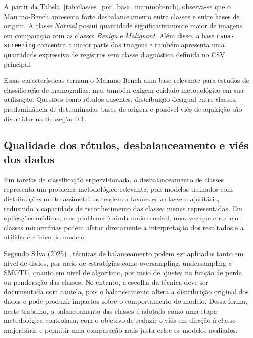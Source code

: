 \documentclass[
    12pt,
    openright,
    oneside,
    a4paper,
    english,
    brazil
]{abntex2}
\begin{document}
A partir da Tabela~\ref{tab:classes_por_base_mammobench}, observa-se que o Mammo-Bench apresenta forte desbalanceamento entre classes e entre bases de origem. A classe \textit{Normal} possui quantidade significativamente maior de imagens em comparação com as classes \textit{Benign} e \textit{Malignant}. Além disso, a base \texttt{rsna-screening} concentra a maior parte das imagens e também apresenta uma quantidade expressiva de registros sem classe diagnóstica definida no CSV principal.

Essas características tornam o Mammo-Bench uma base relevante para estudos de classificação de mamografias, mas também exigem cuidado metodológico em sua utilização. Questões como rótulos ausentes, distribuição desigual entre classes, predominância de determinadas bases de origem e possível viés de aquisição são discutidas na Subseção~\ref{subsec:qualidade_rotulos_balanceamento_vies}.



\subsection{Qualidade dos rótulos, desbalanceamento e viés dos dados}
\label{subsec:qualidade_rotulos_balanceamento_vies}

Em tarefas de classificação supervisionada, o desbalanceamento de classes representa um problema metodológico relevante, pois modelos treinados com distribuições muito assimétricas tendem a favorecer a classe majoritária, reduzindo a capacidade de reconhecimento das classes menos representadas. Em aplicações médicas, esse problema é ainda mais sensível, uma vez que erros em classes minoritárias podem afetar diretamente a interpretação dos resultados e a utilidade clínica do modelo.

Segundo Silva (2025) \cite{silva2025balanceamento}, técnicas de balanceamento podem ser aplicadas tanto em nível de dados, por meio de estratégias como oversampling, undersampling e SMOTE, quanto em nível de algoritmo, por meio de ajustes na função de perda ou ponderação das classes. No entanto, a escolha da técnica deve ser documentada com cautela, pois o balanceamento altera a distribuição original dos dados e pode produzir impactos sobre o comportamento do modelo. Dessa forma, neste trabalho, o balanceamento das classes é adotado como uma etapa metodológica controlada, com o objetivo de reduzir o viés em direção à classe majoritária e permitir uma comparação mais justa entre os modelos avaliados.
\end{document}
